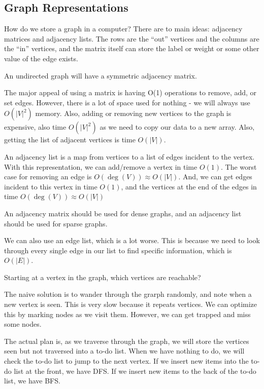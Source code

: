 
\subsection{Graph Representations}

How do we store a graph in a computer? There are to main ideas: adjacency matrices and adjacency lists. The rows are the ``out'' vertices and the columns are the ``in'' vertices, and the matrix itself can store the label or weight or some other value of the edge exists.

\begin{note}
	An undirected graph will have a symmetric adjacency matrix.
\end{note}

The major appeal of using a matrix is having O(1) operations to remove, add, or set edges. However, there is a lot of space used for nothing - we will always use \( O(|V|^2) \) memory. Also, adding or removing new vertices to the graph is expensive, also time \( O(|V|^2) \) as we need to copy our data to a new array. Also, getting the list of adjacent vertices is time \( O(|V|) \).

An adjacency list is a map from vertices to a list of edges incident to the vertex. With this representation, we can add/remove a vertex in time \( O(1) \). The worst case for removing an edge is \( O(\deg(V)) \approx O(|V|) \). And, we can get edges incident to this vertex in time \( O(1) \), and the vertices at the end of the edges in time \( O(\deg(V)) \approx O(|V|) \)

\begin{note}
	An adjacency matrix should be used for dense graphs, and an adjacency list should be used for sparse graphs.
\end{note}

We can also use an edge list, which is a lot worse. This is because we need to look through every single edge in our list to find specific information, which is \( O(|E|) \).

Starting at a vertex in the graph, which vertices are reachable?

The naive solution is to wander through the grarph randomly, and note when a new vertex is seen. This is very slow because it repeats vertices. We can optimize this by marking nodes as we visit them. However, we can get trapped and miss some nodes.

The actual plan is, as we traverse through the graph, we will store the vertices seen but not traversed into a to-do list. When we have nothing to do, we will check the to-do list to jump to the next vertex. If we insert new items into the to-do list at the front, we have DFS. If we insert new items to the back of the to-do list, we have BFS.

